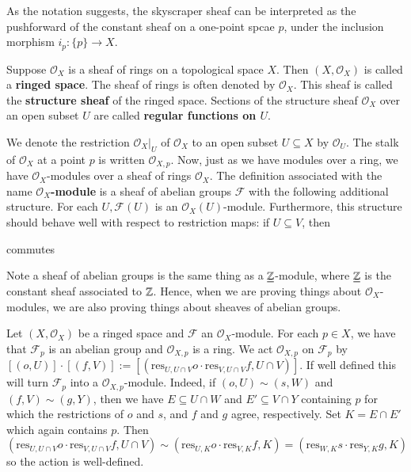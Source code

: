 As the notation suggests, the skyscraper sheaf can be interpreted as the pushforward of the constant sheaf on a one-point spcae $p$, under the inclusion morphism $i_p:\{p\}\rightarrow X$.

\begin{example}
    Suppose $\mathscr{O}_X$ is a sheaf of rings on a topological space $X$. Then $(X,\mathscr{O}_X)$ is called a \textbf{ringed space}. The sheaf of rings is often denoted by $\mathscr{O}_X$. This sheaf is called the \textbf{structure sheaf} of the ringed space. Sections of the structure sheaf $\mathscr{O}_X$ over an open subset $U$ are called \textbf{regular functions on $U$}.
\end{example}

We denote the restriction $\mathscr{O}_X\vert_U$ of $\mathscr{O}_X$ to an open subset $U \subseteq X$ by $\mathscr{O}_U$. The stalk of $\mathscr{O}_X$ at a point $p$ is written $\mathscr{O}_{X,p}$. Now, just as we have modules over a ring, we have $\mathscr{O}_X$-modules over a sheaf of rings $\mathscr{O}_X$. The definition associated with the name \textbf{$\mathscr{O}_X$-module} is a sheaf of abelian groups $\mathscr{F}$ with the following additional structure. For each $U,\mathscr{F}(U)$ is an $\mathscr{O}_X(U)$-module. Furthermore, this structure should behave well with respect to restriction maps: if $U\subseteq V$, then 
\begin{center}
\end{center}
commutes

Note a sheaf of abelian groups is the same thing as a $\underline{\mathbb Z}$-module, where $\underline{\mathbb Z}$ is the constant sheaf associated to $\mathbb Z$. Hence, when we are proving things about $\mathscr{O}_X$-modules, we are also proving things about sheaves of abelian groups.

Let $(X,\mathscr{O}_X)$ be a ringed space and $\mathscr{F}$ an $\mathscr{O}_X$-module. For each $p \in X$, we have that $\mathscr{F}_p$ is an abelian group and $\mathscr{O}_{X,p}$ is a ring. We act $\mathscr{O}_{X,p}$ on $\mathscr{F}_p$ by $[(o,U)]\cdot[(f,V)] := [(\text{res}_{U,U\cap V}o\cdot\text{res}_{V,U\cap V}f,U\cap V)]$. If well defined this will turn $\mathscr{F}_p$ into a $\mathscr{O}_{X,p}$-module. Indeed, if $(o,U)\sim(s,W)$ and $(f,V)\sim(g,Y)$, then we have $E \subseteq U\cap W$ and $E' \subseteq V\cap Y$ containing $p$ for which the restrictions of $o$ and $s$, and $f$ and $g$ agree, respectively. Set $K =E\cap E'$ which again contains $p$. Then \begin{equation*}
    (\text{res}_{U,U\cap V}o\cdot\text{res}_{V,U\cap V}f,U\cap V) \sim (\text{res}_{U,K}o\cdot\text{res}_{V,K}f,K) = (\text{res}_{W,K}s\cdot\text{res}_{Y,K}g,K)
\end{equation*}
so the action is well-defined.


